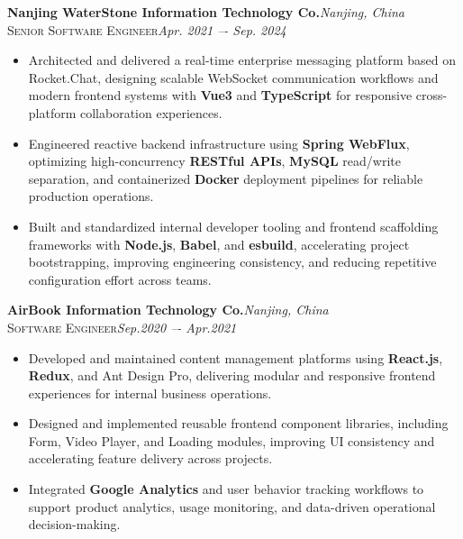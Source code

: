 \documentclass[10pt,a4paper]{article}
\begin{document}
\vspace{4pt}
\noindent\textbf{Nanjing WaterStone Information Technology Co.}\hfill\textit{Nanjing, China}\\
{\scshape\small Senior Software Engineer}\hfill{\small\itshape Apr. 2021 –- Sep. 2024}
\begin{itemize}[leftmargin=*,topsep=2pt,itemsep=1pt,parsep=0pt]
  \item Architected and delivered a real-time enterprise messaging platform based on Rocket.Chat, designing scalable WebSocket communication workflows and modern frontend systems with \textbf{Vue3} and \textbf{TypeScript} for responsive cross-platform collaboration experiences.

  \item Engineered reactive backend infrastructure using \textbf{Spring WebFlux}, optimizing high-concurrency \textbf{RESTful APIs}, \textbf{MySQL} read/write separation, and containerized \textbf{Docker} deployment pipelines for reliable production operations.

  \item Built and standardized internal developer tooling and frontend scaffolding frameworks with \textbf{Node.js}, \textbf{Babel}, and \textbf{esbuild}, accelerating project bootstrapping, improving engineering consistency, and reducing repetitive configuration effort across teams.

\end{itemize}

\vspace{4pt}
\noindent\textbf{AirBook Information Technology Co.}\hfill\textit{Nanjing, China}\\
{\scshape\small Software Engineer}\hfill{\small\itshape Sep.2020 –- Apr.2021}
\begin{itemize}[leftmargin=*,topsep=2pt,itemsep=1pt,parsep=0pt]
  \item Developed and maintained content management platforms using \textbf{React.js}, \textbf{Redux}, and Ant Design Pro, delivering modular and responsive frontend experiences for internal business operations.

  \item Designed and implemented reusable frontend component libraries, including Form, Video Player, and Loading modules, improving UI consistency and accelerating feature delivery across projects.

  \item Integrated \textbf{Google Analytics} and user behavior tracking workflows to support product analytics, usage monitoring, and data-driven operational decision-making.

\end{itemize}
\end{document}
